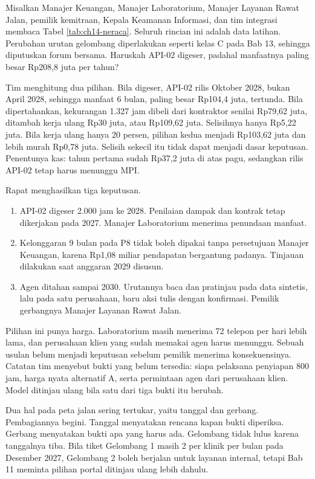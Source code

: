 \begin{kasus}[title={Kasus Medikara Health: Menggeser API-02 dan Menahan Agen}]
Misalkan Manajer Keuangan, Manajer Laboratorium, Manajer Layanan Rawat Jalan, pemilik kemitraan, Kepala Keamanan Informasi, dan tim integrasi membaca Tabel \ref{tab:ch14-neraca}. Seluruh rincian ini adalah data latihan. Perubahan urutan gelombang diperlakukan seperti kelas C pada Bab 13, sehingga diputuskan forum bersama. Haruskah API-02 digeser, padahal manfaatnya paling besar Rp208,8 juta per tahun?

Tim menghitung dua pilihan. Bila digeser, API-02 rilis Oktober 2028, bukan April 2028, sehingga manfaat 6 bulan, paling besar Rp104,4 juta, tertunda. Bila dipertahankan, kekurangan 1.327 jam dibeli dari kontraktor senilai Rp79,62 juta, ditambah kerja ulang Rp30 juta, atau Rp109,62 juta. Selisihnya hanya Rp5,22 juta. Bila kerja ulang hanya 20 persen, pilihan kedua menjadi Rp103,62 juta dan lebih murah Rp0,78 juta. Selisih
sekecil itu tidak dapat menjadi dasar keputusan. Penentunya kas: tahun pertama sudah Rp37,2 juta di atas pagu, sedangkan rilis API-02 tetap harus menunggu MPI.

Rapat menghasilkan tiga keputusan.
\begin{enumerate}
  \item API-02 digeser 2.000 jam ke 2028. Penilaian dampak dan kontrak tetap dikerjakan pada 2027. Manajer Laboratorium menerima penundaan manfaat.
  \item Kelonggaran 9 bulan pada P8 tidak boleh dipakai tanpa persetujuan Manajer Keuangan, karena Rp1,08 miliar pendapatan bergantung padanya. Tinjauan dilakukan saat anggaran 2029 disusun.
  \item Agen ditahan sampai 2030. Urutannya baca dan pratinjau pada data sintetis, lalu pada satu perusahaan, baru aksi tulis dengan konfirmasi. Pemilik gerbangnya Manajer Layanan Rawat Jalan.
\end{enumerate}

Pilihan ini punya harga. Laboratorium masih menerima 72 telepon per hari lebih lama, dan perusahaan klien yang sudah memakai agen harus menunggu. Sebuah usulan belum menjadi keputusan sebelum pemilik menerima konsekuensinya. Catatan tim menyebut bukti yang belum tersedia: siapa pelaksana penyiapan 800 jam, harga nyata alternatif A, serta permintaan agen dari perusahaan klien. Model ditinjau ulang bila satu dari tiga bukti itu berubah.
\end{kasus}

Dua hal pada peta jalan sering tertukar, yaitu tanggal dan gerbang. Pembagiannya begini. Tanggal menyatakan rencana kapan bukti diperiksa. Gerbang menyatakan bukti apa yang harus ada. Gelombang tidak lulus karena tanggalnya tiba. Bila tiket Gelombang 1 masih 2 per klinik per bulan pada Desember 2027, Gelombang 2 boleh berjalan untuk layanan internal, tetapi Bab 11 meminta pilihan portal ditinjau ulang lebih dahulu.


